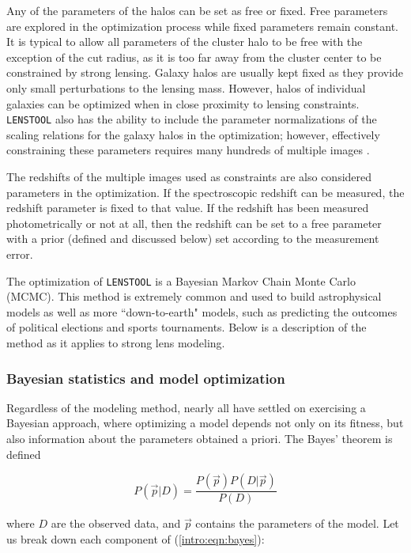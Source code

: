 Any of the parameters of the halos can be set as free or fixed. Free parameters are explored in the optimization process while fixed parameters remain constant. It is typical to allow all parameters of the cluster halo to be free with the exception of the cut radius, as it is too far away from the cluster center to be constrained by strong lensing. Galaxy halos are usually kept fixed as they provide only small perturbations to the lensing mass. However, halos of individual galaxies can be optimized when in close proximity to lensing constraints. \texttt{LENSTOOL} also has the ability to include the parameter normalizations of the scaling relations for the galaxy halos in the optimization; however, effectively constraining these parameters requires many hundreds of multiple images \citep[e.g., ][]{Richard:2014gf}.

The redshifts of the multiple images used as constraints are also considered parameters in the optimization. If the spectroscopic redshift can be measured, the redshift parameter is fixed to that value. If the redshift has been measured photometrically or not at all, then the redshift can be set to a free parameter with a prior (defined and discussed below) set according to the measurement error.

The optimization of \texttt{LENSTOOL} is a Bayesian Markov Chain Monte Carlo (MCMC). This method is extremely common and used to build astrophysical models as well as more ``down-to-earth" models, such as predicting the outcomes of political elections and sports tournaments. Below is a description of the method as it applies to strong lens modeling.

\subsubsection{Bayesian statistics and model optimization}

Regardless of the modeling method, nearly all have settled on exercising a Bayesian approach, where optimizing a model depends not only on its fitness, but also information about the parameters obtained a priori. The Bayes' theorem is defined

\begin{equation}
P(\vec{p} | D ) = \frac{P(\vec{p}) P(D | \vec{p} ) }{P(D)}
\label{intro:eqn:bayes}
\end{equation}

\noindent where $D$ are the observed data, and $\vec{p}$ contains the parameters of the model. Let us break down each component of (\ref{intro:eqn:bayes}):

